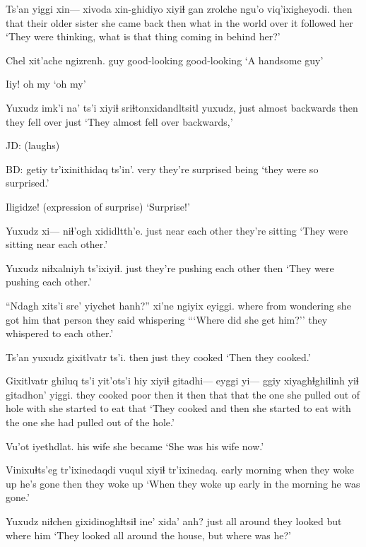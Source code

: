 \documentclass[12pt]{article}
\begin{document}
\gll Ts'an yiggi xin--- xivoda xin-ghidiyo xiyiɬ {gan zrolche} ngu'o viq'ixigheyodi.
then that {} {their older sister} {she came back} then {what in the world} over {it followed her}
\glt `They were thinking, what is that thing coming in behind her?'
\glend

\gll Chel xit'ache ngizrenh.
guy  good-looking good-looking
\glt `A handsome guy'
\glend

\gll Iiy!
{{oh my}}
\glt `oh my'
\glend

\gll Yuxudz imk'i {na' ts'i} xiyiɬ sriɬtonxidandltsitl yuxudz,
just almost backwards then {they fell over} just
\glt `They almost fell over backwards,'
\glend

JD:  (laughs)

BD:
\gll getiy tr'ixinithidaq ts'in'.
very  {they're surprised}           being
\glt `they were so surprised.'
\glend

\gll Iligidze!
{{(expression of surprise)}}
\glt `Surprise!'
\glend

\gll Yuxudz xi--- niɬ'ogh xididltth'e.
just {}  {near each other} {they're sitting }
\glt `They were sitting near each other.'
\glend

\gll Yuxudz niɬxalniyh ts'ixiyiɬ.
just {they're pushing each other} then
\glt `They were pushing each other.'
\glend

\gll ``Ndagh xits'i sre' yiychet hanh?'' xi'ne {ngiyix eyiggi}.
where from   wondering {she got him} {that person}  {they said} whispering
\glt ```Where did she get him?'' they whispered to each other.'
\glend

\gll Ts'an yuxudz gixitlvatr ts'i.
then  just   {they cooked}
\glt `Then they cooked.'
\glend

\gll Gixitlvatr ghiluq ts'i yit'ots'i hiy xiyiɬ gitadhi--- eyggi yi--- ggiy xiyaghɬghilinh yiɬ gitadhon' yiggi.
{they cooked} poor   {} then   it then {}  that   {} that       {the one she pulled out of hole} with {she started to eat} that
\glt `They cooked and then she started to eat with the one she had pulled out of the hole.'
\glend

\gll Vu'ot iyethdlat.
{his wife} {she became}
\glt `She was his wife now.'
\glend

\gll Vinixuɬts'eg tr'ixinedaqdi vuqul xiyiɬ tr'ixinedaq.
{early morning} {when they woke up} {he's gone} then {they woke up}
\glt `When they woke up early in the morning he was gone.'
\glend

\gll Yuxudz niɬchen gixidinoghɬtsiɬ ine' xida' anh? 
just   {all around} {they looked}  but where him 
\glt `They looked all around the house, but where was he?'
\glend
\end{document}
